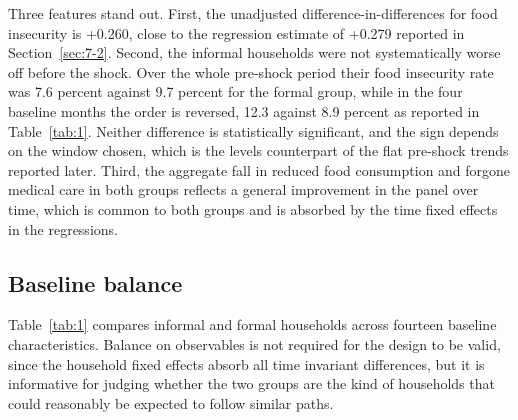 Three features stand out. First, the unadjusted difference-in-differences for food insecurity is +0.260, close to the regression estimate of +0.279 reported in Section~\ref{sec:7-2}. Second, the informal households were not systematically worse off before the shock. Over the whole pre-shock period their food insecurity rate was 7.6 percent against 9.7 percent for the formal group, while in the four baseline months the order is reversed, 12.3 against 8.9 percent as reported in Table~\ref{tab:1}. Neither difference is statistically significant, and the sign depends on the window chosen, which is the levels counterpart of the flat pre-shock trends reported later. Third, the aggregate fall in reduced food consumption and forgone medical care in both groups reflects a general improvement in the panel over time, which is common to both groups and is absorbed by the time fixed effects in the regressions.

\subsection{Baseline balance}\label{sec:5-7}

Table~\ref{tab:1} compares informal and formal households across fourteen baseline characteristics. Balance on observables is not required for the design to be valid, since the household fixed effects absorb all time invariant differences, but it is informative for judging whether the two groups are the kind of households that could reasonably be expected to follow similar paths.

